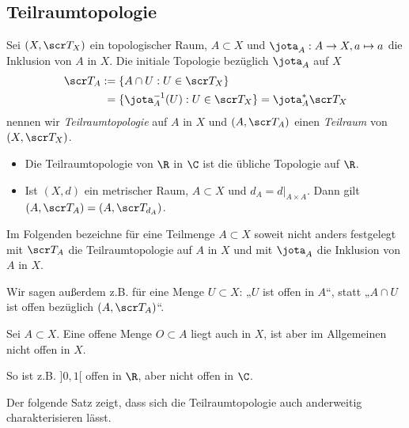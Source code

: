 \subsection{Teilraumtopologie}

\begin{df} \label{df:subspace_topology}
	Sei $(X, \scr T_X)$ ein topologischer Raum, $A \subset X$ und $\jota_A: A \to X, a \mapsto a$ die Inklusion von $A$ in $X$.
	Die initiale Topologie bezüglich $\jota_A$ auf $X$
	\begin{align*}
		\scr T_A
		&:= \{ A \cap U : U \in \scr T_X \} \\
		&\;= \{ \jota_A^{-1}(U) : U \in \scr T_X \}
		= \jota_A^* \scr T_X
	\end{align*}
	nennen wir \emph{Teilraumtopologie} auf $A$ in $X$ und $(A, \scr T_A)$ einen \emph{Teilraum} von $(X, \scr T_X)$.
\end{df}

\begin{ex}
	\begin{itemize}
		\item
			Die Teilraumtopologie von $\R$ in $\C$ ist die übliche Topologie auf $\R$.
		\item
			Ist $(X, d)$ ein metrischer Raum, $A \subset X$ und $d_A = d|_{A\times A}$.
			Dann gilt $(A, \scr T_A) = (A, \scr T_{d_A})$.
	\end{itemize}
\end{ex}

\begin{conv}
	Im Folgenden bezeichne für eine Teilmenge $A \subset X$ soweit nicht anders festgelegt mit $\scr T_A$ die Teilraumtopologie auf $A$ in $X$ und mit $\jota_A$ die Inklusion von $A$ in $X$.

	Wir sagen außerdem z.B. für eine Menge $U \subset X$: „$U$ ist offen in $A$“, statt „$A \cap U$ ist offen bezüglich $(A, \scr T_A)$“.
\end{conv}

\begin{nt}
	Sei $A \subset X$.
	Eine offene Menge $O \subset A$ liegt auch in $X$, ist aber im Allgemeinen nicht offen in $X$.

	So ist z.B. $]0,1[$ offen in $\R$, aber nicht offen in $\C$.
\end{nt}

Der folgende Satz zeigt, dass sich die Teilraumtopologie auch anderweitig charakterisieren lässt.

